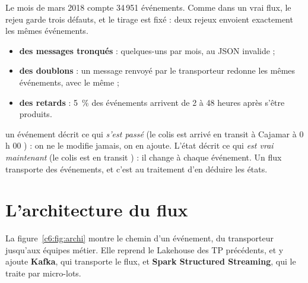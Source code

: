 Le mois de mars 2018 compte 34\,951 événements. Comme dans un vrai flux, le rejeu garde trois
défauts, et le tirage est fixé : deux rejeux envoient exactement les mêmes événements.
\begin{itemize}[leftmargin=*,nosep]
  \item \textbf{des messages tronqués} : quelques-uns par mois, au JSON invalide ;
  \item \textbf{des doublons} : un message renvoyé par le transporteur redonne les mêmes événements, avec le même  ;
  \item \textbf{des retards} : 5~\% des événements arrivent de 2 à 48 heures après s'être produits.
\end{itemize}

\begin{notion}
un événement décrit ce qui \emph{s'est passé} (\og le colis est
arrivé en transit à Cajamar à 0 h 00 \fg{}) : on ne le modifie jamais, on en ajoute. L'état décrit
ce qui \emph{est vrai maintenant} (\og le colis est en transit \fg{}) : il change à chaque
événement. Un flux transporte des événements, et c'est au traitement d'en déduire les états.
\end{notion}

\section{L'architecture du flux}

La figure~\ref{c6:fig:archi} montre le chemin d'un événement, du transporteur jusqu'aux équipes métier.
Elle reprend le Lakehouse des TP précédents, et y ajoute \textbf{Kafka}, qui transporte le flux, et
\textbf{Spark Structured Streaming}, qui le traite par micro-lots.

